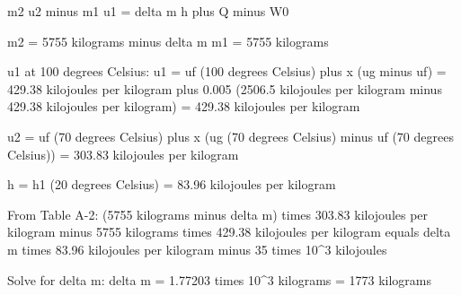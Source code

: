 m2 u2 minus m1 u1 = delta m h plus Q minus W0  

m2 = 5755 kilograms minus delta m  
m1 = 5755 kilograms  

u1 at 100 degrees Celsius:  
u1 = uf (100 degrees Celsius) plus x (ug minus uf)  
= 429.38 kilojoules per kilogram plus 0.005 (2506.5 kilojoules per kilogram minus 429.38 kilojoules per kilogram)  
= 429.38 kilojoules per kilogram  

u2 = uf (70 degrees Celsius) plus x (ug (70 degrees Celsius) minus uf (70 degrees Celsius))  
= 303.83 kilojoules per kilogram  

h = h1 (20 degrees Celsius)  
= 83.96 kilojoules per kilogram  

From Table A-2:  
(5755 kilograms minus delta m) times 303.83 kilojoules per kilogram minus 5755 kilograms times 429.38 kilojoules per kilogram equals delta m times 83.96 kilojoules per kilogram minus 35 times 10^3 kilojoules  

Solve for delta m:  
delta m = 1.77203 times 10^3 kilograms  
= 1773 kilograms